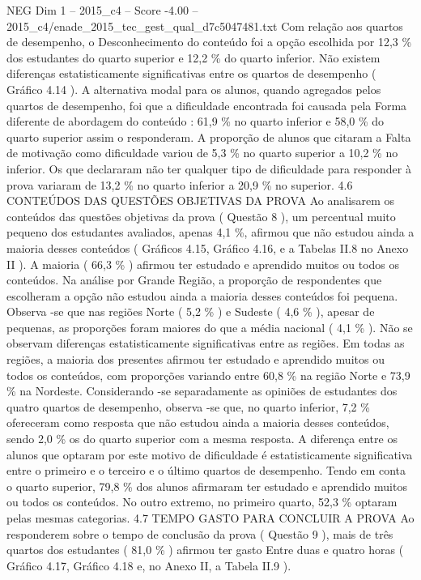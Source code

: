 \begin{textsample}{NEG Dim 1 – 2015\_c4 – Score -4.00 – 2015\_c4/enade\_2015\_tec\_gest\_qual\_d7c5047481.txt}
Com relação aos quartos de desempenho, o Desconhecimento do conteúdo foi a opção escolhida por 12,3 \% dos estudantes do quarto superior e 12,2 \% do quarto inferior.
Não existem diferenças estatisticamente significativas entre os quartos de desempenho ( Gráfico 4.14 ).
A alternativa modal para os alunos, quando agregados pelos quartos de desempenho, foi que a dificuldade encontrada foi causada pela Forma diferente de abordagem do conteúdo : 61,9 \% no quarto inferior e 58,0 \% do quarto superior assim o responderam.
A proporção de alunos que citaram a Falta de motivação como dificuldade variou de 5,3 \% no quarto superior a 10,2 \% no inferior.
Os que declararam não ter qualquer tipo de dificuldade para responder à prova variaram de 13,2 \% no quarto inferior a 20,9 \% no superior. 4.6 CONTEÚDOS DAS QUESTÕES OBJETIVAS DA PROVA Ao analisarem os conteúdos das questões objetivas da prova ( Questão 8 ), um percentual muito pequeno dos estudantes avaliados, apenas 4,1 \%, afirmou que não estudou ainda a maioria desses conteúdos ( Gráficos 4.15, Gráfico 4.16, e a Tabelas II.8 no Anexo II ).
A maioria ( 66,3 \% ) afirmou ter estudado e aprendido muitos ou todos os conteúdos.
Na análise por Grande Região, a proporção de respondentes que escolheram a opção não estudou ainda a maioria desses conteúdos foi pequena.
Observa -se que nas regiões Norte ( 5,2 \% ) e Sudeste ( 4,6 \% ), apesar de pequenas, as proporções foram maiores do que a média nacional ( 4,1 \% ).
Não se observam diferenças estatisticamente significativas entre as regiões.
Em todas as regiões, a maioria dos presentes afirmou ter estudado e aprendido muitos ou todos os conteúdos, com proporções variando entre 60,8 \% na região Norte e 73,9 \% na Nordeste.
Considerando -se separadamente as opiniões de estudantes dos quatro quartos de desempenho, observa -se que, no quarto inferior, 7,2 \% ofereceram como resposta que não estudou ainda a maioria desses conteúdos, sendo 2,0 \% os do quarto superior com a mesma resposta.
A diferença entre os alunos que optaram por este motivo de dificuldade é estatisticamente significativa entre o primeiro e o terceiro e o último quartos de desempenho.
Tendo em conta o quarto superior, 79,8 \% dos alunos afirmaram ter estudado e aprendido muitos ou todos os conteúdos.
No outro extremo, no primeiro quarto, 52,3 \% optaram pelas mesmas categorias. 4.7 TEMPO GASTO PARA CONCLUIR A PROVA Ao responderem sobre o tempo de conclusão da prova ( Questão 9 ), mais de três quartos dos estudantes ( 81,0 \% ) afirmou ter gasto Entre duas e quatro horas ( Gráfico 4.17, Gráfico 4.18 e, no Anexo II, a Tabela II.9 ).

\end{textsample}
